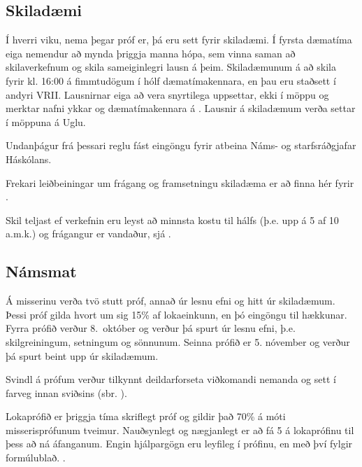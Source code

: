 \documentclass[a4paper,10pt,icelandic]{sphinxmanual}
\begin{document}
\subsection{Skiladæmi}
\label{\detokenize{vidauki:skiladaemi}}
Í hverri viku, nema þegar próf er, þá eru sett fyrir
skiladæmi. Í fyrsta dæmatíma eiga nemendur að mynda þriggja manna hópa,
sem  vinna saman að skilaverkefnum og skila sameiginlegri lausn á þeim.
Skiladæmunum á að skila fyrir kl. 16:00 á fimmtudögum í hólf
dæmatímakennara, en þau eru staðsett í andyri VRII. Lausnirnar eiga að
vera snyrtilega uppsettar, ekki í möppu og merktar nafni ykkar og
dæmatímakennara á . Lausnir á
skiladæmum verða settar í möppuna  á Uglu.

\begin{center}
\end{center}
Undanþágur frá þessari reglu fást eingöngu fyrir atbeina Náms- og starfsráðgjafar Háskólans.

Frekari leiðbeiningar um frágang og framsetningu skiladæma er að finna
hér fyrir {\hyperref[\detokenize{vidauki:fragangurskiladaema}]{}}.

Skil teljast  ef verkefnin eru leyst að minnsta kostu til
hálfs (þ.e. upp á 5 af 10 a.m.k.) og frágangur er vandaður, sjá
{\hyperref[\detokenize{vidauki:fragangurskiladaema}]{}}.


\subsection{Námsmat}
\label{\detokenize{vidauki:namsmat}}
Á misserinu verða tvö stutt próf, annað úr lesnu efni og
hitt úr skiladæmum. Þessi próf gilda hvort um sig 15\% af lokaeinkunn, en
þó eingöngu til hækkunar. Fyrra prófið verður 8. október og verður þá
spurt úr lesnu efni, þ.e. skilgreiningum, setningum og sönnunum. Seinna
prófið er 5. nóvember og verður þá spurt beint upp úr skiladæmum.

Svindl á prófum verður
tilkynnt deildarforseta viðkomandi nemanda og sett í
farveg innan sviðsins (sbr.
).

Lokaprófið er þriggja tíma skriflegt próf og gildir það 70\% á móti
misserisprófunum tveimur. Nauðsynlegt og nægjanlegt er að fá 5 á
lokaprófinu til þess að ná áfanganum. Engin hjálpargögn eru
leyfileg í prófinu, en með því fylgir formúlublað.
.
\end{document}

